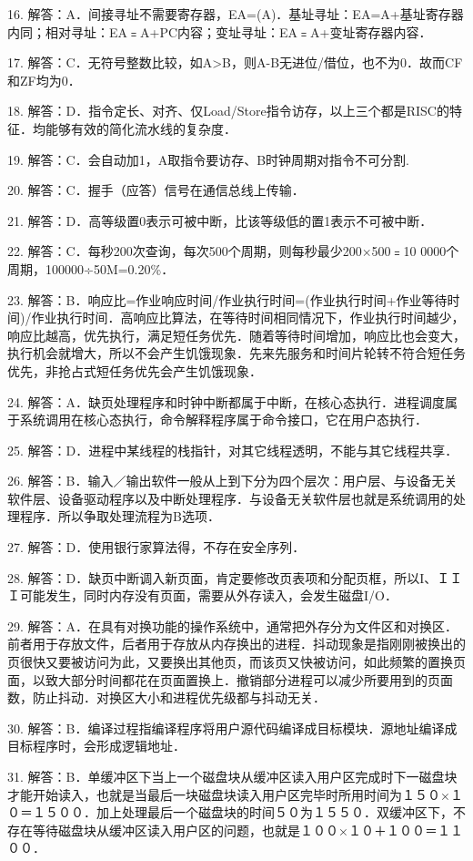 16. 解答：A．间接寻址不需要寄存器，EA=(A)．基址寻址：EA=A+基址寄存器内同；相对寻址：EA﹦A+PC内容；变址寻址：EA﹦A+变址寄存器内容．

17. 解答：C．无符号整数比较，如A>B，则A-B无进位/借位，也不为0．故而CF和ZF均为0．

18. 解答：D．指令定长、对齐、仅Load/Store指令访存，以上三个都是RISC的特征．均能够有效的简化流水线的复杂度．

19. 解答：C．会自动加1，A取指令要访存、B时钟周期对指令不可分割.

20. 解答：C．握手（应答）信号在通信总线上传输．

21. 解答：D．高等级置0表示可被中断，比该等级低的置1表示不可被中断．

22. 解答：C．每秒200次查询，每次500个周期，则每秒最少200×500﹦10 0000个周期，100000÷50M=0.20\%．

23. 解答：B．响应比=作业响应时间/作业执行时间=(作业执行时间+作业等待时间)/作业执行时间．高响应比算法，在等待时间相同情况下，作业执行时间越少，响应比越高，优先执行，满足短任务优先．随着等待时间增加，响应比也会变大，执行机会就增大，所以不会产生饥饿现象．先来先服务和时间片轮转不符合短任务优先，非抢占式短任务优先会产生饥饿现象．

24. 解答：A．缺页处理程序和时钟中断都属于中断，在核心态执行．进程调度属于系统调用在核心态执行，命令解释程序属于命令接口，它在用户态执行．

25. 解答：D．进程中某线程的栈指针，对其它线程透明，不能与其它线程共享．

26. 解答：B．输入／输出软件一般从上到下分为四个层次：用户层、与设备无关软件层、设备驱动程序以及中断处理程序．与设备无关软件层也就是系统调用的处理程序．所以争取处理流程为B选项．

27. 解答：D．使用银行家算法得，不存在安全序列．

28. 解答：D．缺页中断调入新页面，肯定要修改页表项和分配页框，所以I、ＩＩＩ可能发生，同时内存没有页面，需要从外存读入，会发生磁盘I/O．

29. 解答：A．在具有对换功能的操作系统中，通常把外存分为文件区和对换区．前者用于存放文件，后者用于存放从内存换出的进程．抖动现象是指刚刚被换出的页很快又要被访问为此，又要换出其他页，而该页又快被访问，如此频繁的置换页面，以致大部分时间都花在页面置换上．撤销部分进程可以减少所要用到的页面数，防止抖动．对换区大小和进程优先级都与抖动无关．

30. 解答：B．编译过程指编译程序将用户源代码编译成目标模块．源地址编译成目标程序时，会形成逻辑地址．

31. 解答：B．单缓冲区下当上一个磁盘块从缓冲区读入用户区完成时下一磁盘块才能开始读入，也就是当最后一块磁盘块读入用户区完毕时所用时间为１５０×１０＝１５００．加上处理最后一个磁盘块的时间５０为１５５０．双缓冲区下，不存在等待磁盘块从缓冲区读入用户区的问题，也就是１００×１０＋１００＝１１００．

